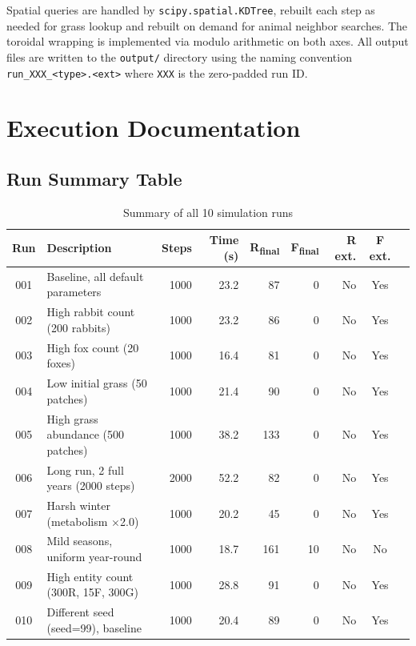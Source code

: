 \documentclass[12pt]{article}
\begin{document}
Spatial queries are handled by \texttt{scipy.spatial.KDTree}, rebuilt each
step as needed for grass lookup and rebuilt on demand for animal neighbor
searches. The toroidal wrapping is implemented via modulo arithmetic on both
axes. All output files are written to the \texttt{output/} directory using the
naming convention \texttt{run\_XXX\_<type>.<ext>} where \texttt{XXX} is the
zero-padded run ID.

\section{Execution Documentation}

\subsection{Run Summary Table}

\begin{table}[H]
\centering
\caption{Summary of all 10 simulation runs}
\small
\begin{tabular}{clrrrrrcc}
\toprule
\textbf{Run} & \textbf{Description} & \textbf{Steps} & \textbf{Time (s)} &
\textbf{R\textsubscript{final}} & \textbf{F\textsubscript{final}} &
\textbf{R ext.} & \textbf{F ext.} \\
\midrule
001 & Baseline, all default parameters       & 1000 & 23.2 & 87  & 0  & No & Yes \\
002 & High rabbit count (200 rabbits)        & 1000 & 23.2 & 86  & 0  & No & Yes \\
003 & High fox count (20 foxes)              & 1000 & 16.4 & 81  & 0  & No & Yes \\
004 & Low initial grass (50 patches)         & 1000 & 21.4 & 90  & 0  & No & Yes \\
005 & High grass abundance (500 patches)     & 1000 & 38.2 & 133 & 0  & No & Yes \\
006 & Long run, 2 full years (2000 steps)    & 2000 & 52.2 & 82  & 0  & No & Yes \\
007 & Harsh winter (metabolism $\times$2.0)  & 1000 & 20.2 & 45  & 0  & No & Yes \\
008 & Mild seasons, uniform year-round       & 1000 & 18.7 & 161 & 10 & No & No  \\
009 & High entity count (300R, 15F, 300G)    & 1000 & 28.8 & 91  & 0  & No & Yes \\
010 & Different seed (seed=99), baseline     & 1000 & 20.4 & 89  & 0  & No & Yes \\
\bottomrule
\end{tabular}
\end{table}
\end{document}
